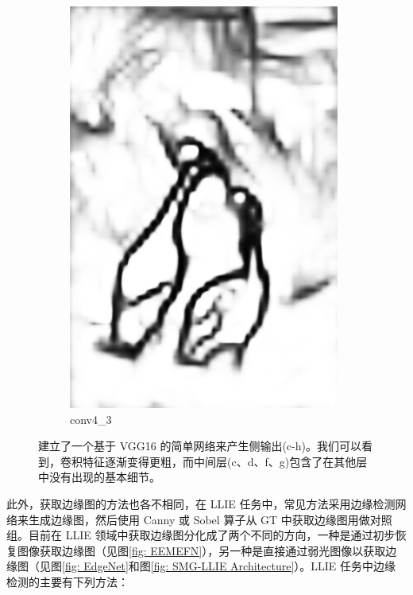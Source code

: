 \documentclass[a4paper]{ctexart}
\begin{document}
\begin{figure}[htb]
\begin{subfigure}{0.2\textwidth}
			\includegraphics[width=\linewidth]{picture/LLIE/RCF/conv4_3}
			\captionsetup{font=scriptsize}
			\caption{conv4\_3}
			\label{fig: conv4_3}	
		\end{subfigure}
		\caption{
			\label{fig: Motivation of RCF}
			建立了一个基于 VGG16\cite{simonyan2014very} 的简单网络来产生侧输出(c-h)。我们可以看到，卷积特征逐渐变得更粗，而中间层(c、d、f、g)包含了在其他层中没有出现的基本细节。
		}
	\end{figure}
	\FloatBarrier

	此外，获取边缘图的方法也各不相同，在 LLIE 任务中，常见方法采用边缘检测网络来生成边缘图，然后使用 Canny 或 Sobel 算子\cite{maini2009study}从 GT 中获取边缘图用做对照组。目前在 LLIE 领域中获取边缘图分化成了两个不同的方向，一种是通过初步恢复图像获取边缘图（见图\ref{fig: EEMEFN}），另一种是直接通过弱光图像以获取边缘图（见图\ref{fig: EdgeNet}和图\ref{fig: SMG-LLIE Architecture}）。LLIE 任务中边缘检测的主要有下列方法：
	
\end{document}
